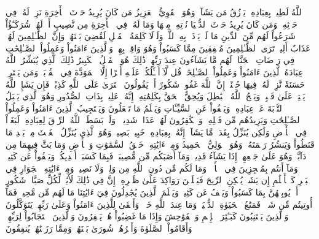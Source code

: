ٱللَّهُ لَطِيفُۢ بِعِبَادِهِۦ يَرۡزُقُ مَن يَشَآءُۖ وَهُوَ ٱلۡقَوِيُّ ٱلۡعَزِيزُ
مَن كَانَ يُرِيدُ حَرۡثَ ٱلۡأٓخِرَةِ نَزِدۡ لَهُۥ فِي حَرۡثِهِۦۖ وَمَن كَانَ يُرِيدُ حَرۡثَ ٱلدُّنۡيَا نُؤۡتِهِۦ مِنۡهَا وَمَا لَهُۥ فِي ٱلۡأٓخِرَةِ مِن نَّصِيبٍ
أَمۡ لَهُمۡ شُرَكَـٰٓؤُاْ شَرَعُواْ لَهُم مِّنَ ٱلدِّينِ مَا لَمۡ يَأۡذَنۢ بِهِ ٱللَّهُۚ وَلَوۡلَا كَلِمَةُ ٱلۡفَصۡلِ لَقُضِيَ بَيۡنَهُمۡۗ وَإِنَّ ٱلظَّـٰلِمِينَ لَهُمۡ عَذَابٌ أَلِيمٞ
تَرَى ٱلظَّـٰلِمِينَ مُشۡفِقِينَ مِمَّا كَسَبُواْ وَهُوَ وَاقِعُۢ بِهِمۡۗ وَٱلَّذِينَ ءَامَنُواْ وَعَمِلُواْ ٱلصَّـٰلِحَٰتِ فِي رَوۡضَاتِ ٱلۡجَنَّاتِۖ لَهُم مَّا يَشَآءُونَ عِندَ رَبِّهِمۡۚ ذَٰلِكَ هُوَ ٱلۡفَضۡلُ ٱلۡكَبِيرُ
ذَٰلِكَ ٱلَّذِي يُبَشِّرُ ٱللَّهُ عِبَادَهُ ٱلَّذِينَ ءَامَنُواْ وَعَمِلُواْ ٱلصَّـٰلِحَٰتِۗ قُل لَّآ أَسۡـَٔلُكُمۡ عَلَيۡهِ أَجۡرًا إِلَّا ٱلۡمَوَدَّةَ فِي ٱلۡقُرۡبَىٰۗ وَمَن يَقۡتَرِفۡ حَسَنَةٗ نَّزِدۡ لَهُۥ فِيهَا حُسۡنًاۚ إِنَّ ٱللَّهَ غَفُورٞ شَكُورٌ
أَمۡ يَقُولُونَ ٱفۡتَرَىٰ عَلَى ٱللَّهِ كَذِبٗاۖ فَإِن يَشَإِ ٱللَّهُ يَخۡتِمۡ عَلَىٰ قَلۡبِكَۗ وَيَمۡحُ ٱللَّهُ ٱلۡبَٰطِلَ وَيُحِقُّ ٱلۡحَقَّ بِكَلِمَٰتِهِۦٓۚ إِنَّهُۥ عَلِيمُۢ بِذَاتِ ٱلصُّدُورِ
وَهُوَ ٱلَّذِي يَقۡبَلُ ٱلتَّوۡبَةَ عَنۡ عِبَادِهِۦ وَيَعۡفُواْ عَنِ ٱلسَّيِّـَٔاتِ وَيَعۡلَمُ مَا تَفۡعَلُونَ
وَيَسۡتَجِيبُ ٱلَّذِينَ ءَامَنُواْ وَعَمِلُواْ ٱلصَّـٰلِحَٰتِ وَيَزِيدُهُم مِّن فَضۡلِهِۦۚ وَٱلۡكَٰفِرُونَ لَهُمۡ عَذَابٞ شَدِيدٞ
۞وَلَوۡ بَسَطَ ٱللَّهُ ٱلرِّزۡقَ لِعِبَادِهِۦ لَبَغَوۡاْ فِي ٱلۡأَرۡضِ وَلَٰكِن يُنَزِّلُ بِقَدَرٖ مَّا يَشَآءُۚ إِنَّهُۥ بِعِبَادِهِۦ خَبِيرُۢ بَصِيرٞ
وَهُوَ ٱلَّذِي يُنَزِّلُ ٱلۡغَيۡثَ مِنۢ بَعۡدِ مَا قَنَطُواْ وَيَنشُرُ رَحۡمَتَهُۥۚ وَهُوَ ٱلۡوَلِيُّ ٱلۡحَمِيدُ
وَمِنۡ ءَايَٰتِهِۦ خَلۡقُ ٱلسَّمَٰوَٰتِ وَٱلۡأَرۡضِ وَمَا بَثَّ فِيهِمَا مِن دَآبَّةٖۚ وَهُوَ عَلَىٰ جَمۡعِهِمۡ إِذَا يَشَآءُ قَدِيرٞ
وَمَآ أَصَٰبَكُم مِّن مُّصِيبَةٖ فَبِمَا كَسَبَتۡ أَيۡدِيكُمۡ وَيَعۡفُواْ عَن كَثِيرٖ
وَمَآ أَنتُم بِمُعۡجِزِينَ فِي ٱلۡأَرۡضِۖ وَمَا لَكُم مِّن دُونِ ٱللَّهِ مِن وَلِيّٖ وَلَا نَصِيرٖ
وَمِنۡ ءَايَٰتِهِ ٱلۡجَوَارِ فِي ٱلۡبَحۡرِ كَٱلۡأَعۡلَٰمِ
إِن يَشَأۡ يُسۡكِنِ ٱلرِّيحَ فَيَظۡلَلۡنَ رَوَاكِدَ عَلَىٰ ظَهۡرِهِۦٓۚ إِنَّ فِي ذَٰلِكَ لَأٓيَٰتٖ لِّكُلِّ صَبَّارٖ شَكُورٍ
أَوۡ يُوبِقۡهُنَّ بِمَا كَسَبُواْ وَيَعۡفُ عَن كَثِيرٖ
وَيَعۡلَمَ ٱلَّذِينَ يُجَٰدِلُونَ فِيٓ ءَايَٰتِنَا مَا لَهُم مِّن مَّحِيصٖ
فَمَآ أُوتِيتُم مِّن شَيۡءٖ فَمَتَٰعُ ٱلۡحَيَوٰةِ ٱلدُّنۡيَاۚ وَمَا عِندَ ٱللَّهِ خَيۡرٞ وَأَبۡقَىٰ لِلَّذِينَ ءَامَنُواْ وَعَلَىٰ رَبِّهِمۡ يَتَوَكَّلُونَ
وَٱلَّذِينَ يَجۡتَنِبُونَ كَبَـٰٓئِرَ ٱلۡإِثۡمِ وَٱلۡفَوَٰحِشَ وَإِذَا مَا غَضِبُواْ هُمۡ يَغۡفِرُونَ
وَٱلَّذِينَ ٱسۡتَجَابُواْ لِرَبِّهِمۡ وَأَقَامُواْ ٱلصَّلَوٰةَ وَأَمۡرُهُمۡ شُورَىٰ بَيۡنَهُمۡ وَمِمَّا رَزَقۡنَٰهُمۡ يُنفِقُونَ
